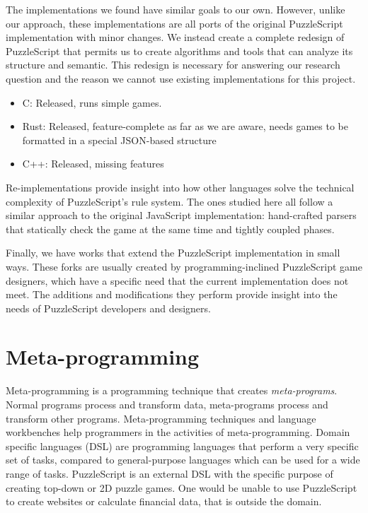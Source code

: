 The implementations we found have similar goals to our own. However, unlike our approach, these implementations are all ports of the original PuzzleScript implementation with minor changes. We instead create a complete redesign of PuzzleScript that permits us to create algorithms and tools that can analyze its structure and semantic. This redesign is necessary for answering our research question and the reason we cannot use existing implementations for this project.

\begin{itemize}
    \item C\cite{puzzleengine}: Released, runs simple games.
    \item Rust\cite{puzzlescriptrust}: Released, feature-complete as far as we are aware, needs games to be formatted in a special JSON-based structure
    \item C++\cite{Psionic}: Released, missing features
\end{itemize}

Re-implementations provide insight into how other languages solve the technical complexity of PuzzleScript's rule system. The ones studied here all follow a similar approach to the original JavaScript implementation: hand-crafted parsers that statically check the game at the same time and tightly coupled phases.

Finally, we have works that extend the PuzzleScript implementation in small ways\cite{smoothscreen}\cite{irreversible}. These forks are usually created by programming-inclined PuzzleScript game designers, which have a specific need that the current implementation does not meet. The additions and modifications they perform provide insight into the needs of PuzzleScript developers and designers.

\section{Meta-programming}
Meta-programming is a programming technique that creates \emph{meta-programs}. Normal programs process and transform data, meta-programs process and transform other programs. Meta-programming techniques and language workbenches help programmers in the activities of meta-programming. Domain specific languages (DSL) are programming languages that perform a very specific set of tasks, compared to general-purpose languages which can be used for a wide range of tasks. PuzzleScript is an external DSL with the specific purpose of creating top-down or 2D puzzle games. One would be unable to use PuzzleScript to create websites or calculate financial data, that is outside the domain.

